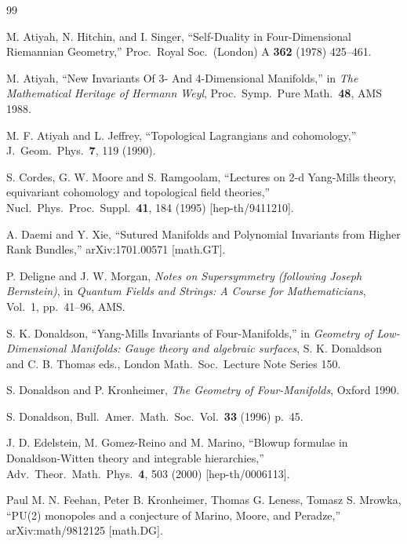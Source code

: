 
\begin{thebibliography}{99}
\setlength{\itemsep}{2pt}

 M. Atiyah, N. Hitchin, and I. Singer, ``Self-Duality in Four-Dimensional
Riemannian Geometry,'' Proc.\ Royal Soc.\ (London) A \textbf{362} (1978) 425--461.

 M. Atiyah, ``New Invariants Of 3- And 4-Dimensional Manifolds,'' in
\emph{The Mathematical Heritage of Hermann Weyl}, Proc.\ Symp.\ Pure Math.\ \textbf{48},
AMS 1988.

 M. F. Atiyah and L. Jeffrey, ``Topological Lagrangians and cohomology,''
J.\ Geom.\ Phys.\ \textbf{7}, 119 (1990).

 S. Cordes, G. W. Moore and S. Ramgoolam, ``Lectures on 2-d Yang-Mills
theory, equivariant cohomology and topological field theories,'' Nucl.\ Phys.\ Proc.\
Suppl.\ \textbf{41}, 184 (1995) [hep-th/9411210].

 A. Daemi and Y. Xie, ``Sutured Manifolds and Polynomial Invariants from
Higher Rank Bundles,'' arXiv:1701.00571 [math.GT].

 P. Deligne and J. W. Morgan, \emph{Notes on Supersymmetry (following
Joseph Bernstein)}, in \emph{Quantum Fields and Strings: A Course for Mathematicians},
Vol.~1, pp.~41--96, AMS.

 S. K. Donaldson, ``Yang-Mills Invariants of Four-Manifolds,'' in
\emph{Geometry of Low-Dimensional Manifolds: Gauge theory and algebraic surfaces},
S. K. Donaldson and C. B. Thomas eds., London Math.\ Soc.\ Lecture Note Series 150.

 S. Donaldson and P. Kronheimer, \emph{The Geometry of Four-Manifolds},
Oxford 1990.

 S. Donaldson, Bull.\ Amer.\ Math.\ Soc.\ Vol.~\textbf{33} (1996) p.~45.

 J. D. Edelstein, M. Gomez-Reino and M. Marino, ``Blowup formulae in
Donaldson-Witten theory and integrable hierarchies,'' Adv.\ Theor.\ Math.\ Phys.\
\textbf{4}, 503 (2000) [hep-th/0006113].

 Paul M. N. Feehan, Peter B. Kronheimer, Thomas G. Leness, Tomasz S.
Mrowka, ``PU(2) monopoles and a conjecture of Marino, Moore, and Peradze,''
arXiv:math/9812125 [math.DG].


\end{thebibliography}
